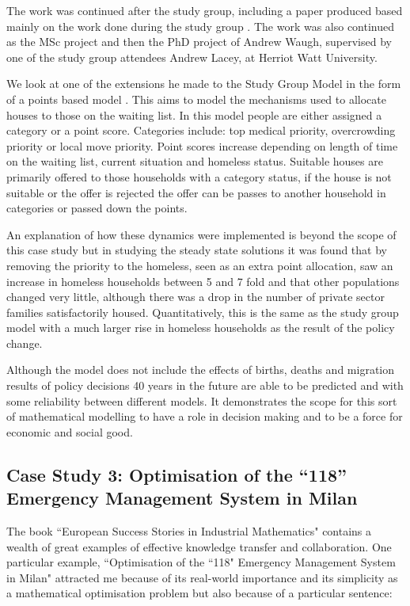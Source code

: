 \documentclass[11pt]{article} %
\begin{document}
	The work was continued after the study group, including a paper produced based mainly on the work done during the study group \cite{Byatt-Smith2003}. The work was also continued as the MSc project and then the PhD project of Andrew Waugh, supervised by one of the study group attendees Andrew Lacey, at Herriot Watt University. 
	
	We look at one of the extensions he made to the Study Group Model in the form of a points based model \cite{Waugh1999}. This aims to model the mechanisms used to allocate houses to those on the waiting list.  In this model people are either assigned a category or a point score. Categories include:  top medical priority, overcrowding priority or local move priority.   Point scores increase depending on length of time on the waiting list, current situation and homeless status. Suitable houses are primarily offered to those households with a category status, if the house is not suitable or the offer is rejected the offer can be passes to another household in categories or passed down the points. 
	
	An explanation of how these dynamics were implemented is beyond the scope of this case study but in studying the steady state solutions it was found that by removing the priority to the homeless, seen as an extra point allocation, saw an increase in homeless households between 5 and 7 fold and that other populations changed very little, although there was a drop in the number of private sector families satisfactorily housed. Quantitatively, this is the same as the study group model with a much larger rise in homeless households as the result of the policy change. 
	
	Although the model does not include the effects of births, deaths and migration results of policy decisions 40 years in the future are able to be predicted and with some reliability between different models. It demonstrates the scope for this sort of mathematical modelling to have a role in decision making and to be a force for economic and social good. 
	
	\subsection{Case Study 3: Optimisation of the “118” Emergency Management System in Milan \label{Milan} }
	The book ``European Success Stories in Industrial Mathematics" \cite{European2011} contains a wealth of great examples of effective knowledge transfer and collaboration. One particular example, ``Optimisation of the ``118" Emergency Management System in Milan" attracted me because of its real-world importance and its simplicity as a mathematical optimisation problem but also because of a particular sentence: 
	
\end{document}
